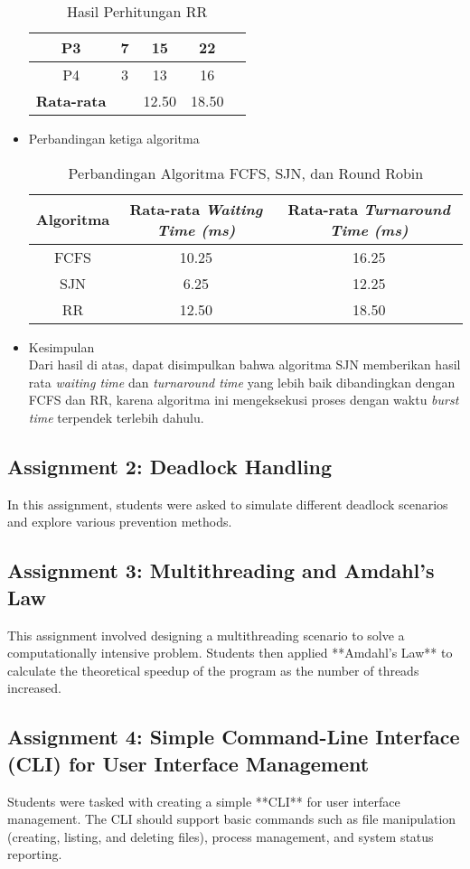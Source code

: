 \documentclass[12pt]{article}
\begin{document}
\begin{itemize}
\begin{table}[H]
\begin{tabular}{|c|c|c|c|c|}
    P3 & 7 & 15 & 22 \\ \hline
    P4 & 3 & 13 & 16 \\ \hline
    \textbf{Rata-rata} &  & 12.50 & 18.50 \\ \hline
    \end{tabular}
    \caption{Hasil Perhitungan RR}
    \end{table}
    \item Perbandingan ketiga algoritma
    \begin{table}[H]
    \centering
    \begin{tabular}{|c|c|c|}
    \hline
    \textbf{Algoritma} & \textbf{Rata-rata \textit{Waiting Time (ms)}} & \textbf{Rata-rata \textit{Turnaround Time (ms)}} \\ \hline
    FCFS & 10.25 & 16.25 \\ \hline
    SJN  & 6.25  & 12.25 \\ \hline
    RR   & 12.50 & 18.50 \\ \hline
    \end{tabular}
    \caption{Perbandingan Algoritma FCFS, SJN, dan Round Robin}
    \end{table}
    \item Kesimpulan \\
    Dari hasil di atas, dapat disimpulkan bahwa algoritma SJN memberikan hasil rata \textit{waiting time} dan \textit{turnaround time} yang lebih baik dibandingkan dengan FCFS dan RR, karena algoritma ini mengeksekusi proses dengan waktu \textit{burst time} terpendek terlebih dahulu. 
    \end{itemize}
    
\subsection{Assignment 2: Deadlock Handling}
In this assignment, students were asked to simulate different deadlock scenarios and explore various prevention methods.

\subsection{Assignment 3: Multithreading and Amdahl's Law}
This assignment involved designing a multithreading scenario to solve a computationally intensive problem. Students then applied **Amdahl's Law** to calculate the theoretical speedup of the program as the number of threads increased.

\subsection{Assignment 4: Simple Command-Line Interface (CLI) for User Interface Management}
Students were tasked with creating a simple **CLI** for user interface management. The CLI should support basic commands such as file manipulation (creating, listing, and deleting files), process management, and system status reporting.
\end{document}
